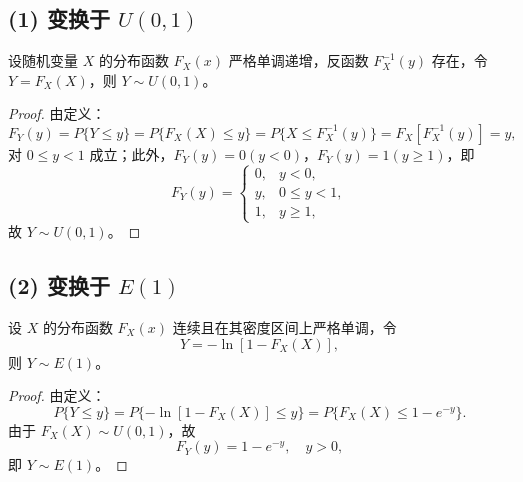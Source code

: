 \subsection*{(1) 变换于 $U(0,1)$}
\begin{example}{}{}
      设随机变量 $X$ 的分布函数 $F_X(x)$ 严格单调递增，反函数 $F_X^{-1}(y)$ 存在，令 $Y = F_X(X)$，则 $Y \sim U(0,1)$。
\end{example}
\begin{proof}
      由定义：
      $$
            F_Y(y) = P\{Y \le y\} = P\{F_X(X) \le y\} = P\{X \le F_X^{-1}(y)\} = F_X[F_X^{-1}(y)] = y,
      $$
      对 $0 \le y < 1$ 成立；此外，$F_Y(y) = 0 (y < 0)$，$F_Y(y) = 1 (y \ge 1)$，即
      $$
            F_Y(y) =
            \begin{cases}
                  0, & y < 0,       \\
                  y, & 0 \le y < 1, \\
                  1, & y \ge 1,
            \end{cases}
      $$
      故 $Y \sim U(0,1)$。
\end{proof}


\subsection*{(2) 变换于 $E(1)$}
\begin{example}{}{}
      设 $X$ 的分布函数 $F_X(x)$ 连续且在其密度区间上严格单调，令
      $$
            Y = -\ln[1 - F_X(X)],
      $$
      则 $Y \sim E(1)$。
\end{example}
\begin{proof}
      由定义：
      $$
            P\{Y \le y\} = P\{-\ln[1 - F_X(X)] \le y\} = P\{F_X(X) \le 1 - e^{-y}\}.
      $$
      由于 $F_X(X) \sim U(0,1)$，故
      $$
            F_Y(y) = 1 - e^{-y}, \quad y > 0,
      $$
      即 $Y \sim E(1)$。
\end{proof}